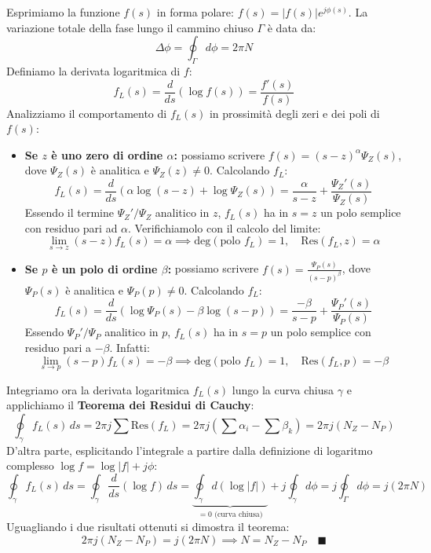 Esprimiamo la funzione $f(s)$ in forma polare: $f(s) = |f(s)| e^{j\phi(s)}$. 
La variazione totale della fase lungo il cammino chiuso $\Gamma$ è data da:
\[
    \Delta \phi = \oint_\Gamma d\phi = 2\pi N
\]
Definiamo la derivata logaritmica di $f$:
\[
    f_L(s) = \frac{d}{ds}(\log f(s)) = \frac{f'(s)}{f(s)}
\]
Analizziamo il comportamento di $f_L(s)$ in prossimità degli zeri e dei poli di $f(s)$:
\begin{itemize}
    \item \textbf{Se $z$ è uno zero di ordine $\alpha$:} possiamo scrivere $f(s) = (s-z)^\alpha \Psi_Z(s)$, dove $\Psi_Z(s)$ è analitica e $\Psi_Z(z) \neq 0$. Calcolando $f_L$:
    \[
        f_L(s) = \frac{d}{ds} \left( \alpha \log(s-z) + \log \Psi_Z(s) \right) = \frac{\alpha}{s-z} + \frac{\Psi_Z'(s)}{\Psi_Z(s)}
    \]
    Essendo il termine $\Psi_Z'/\Psi_Z$ analitico in $z$, $f_L(s)$ ha in $s=z$ un polo semplice con residuo pari ad $\alpha$. Verifichiamolo con il calcolo del limite:
    \[
        \lim_{s \to z} (s-z) f_L(s) = \alpha \implies \text{deg}(\text{polo } f_L) = 1, \quad \text{Res}(f_L, z) = \alpha
    \]
    \item \textbf{Se $p$ è un polo di ordine $\beta$:} possiamo scrivere $f(s) = \frac{\Psi_P(s)}{(s-p)^\beta}$, dove $\Psi_P(s)$ è analitica e $\Psi_P(p) \neq 0$. Calcolando $f_L$:
    \[
        f_L(s) = \frac{d}{ds} \left( \log \Psi_P(s) - \beta \log(s-p) \right) = \frac{-\beta}{s-p} + \frac{\Psi_P'(s)}{\Psi_P(s)}
    \]
    Essendo $\Psi_P'/\Psi_P$ analitico in $p$, $f_L(s)$ ha in $s=p$ un polo semplice con residuo pari a $-\beta$. Infatti:
    \[
        \lim_{s \to p} (s-p) f_L(s) = -\beta \implies \text{deg}(\text{polo } f_L) = 1, \quad \text{Res}(f_L, p) = -\beta
    \]
\end{itemize}

Integriamo ora la derivata logaritmica $f_L(s)$ lungo la curva chiusa $\gamma$ e applichiamo il \textbf{Teorema dei Residui di Cauchy}:
\[
    \oint_\gamma f_L(s) \, ds = 2\pi j \sum \text{Res}(f_L) = 2\pi j \left( \sum \alpha_i - \sum \beta_k \right) = 2\pi j (N_Z - N_P)
\]
D'altra parte, esplicitando l'integrale a partire dalla definizione di logaritmo complesso $\log f = \log |f| + j\phi$:
\[
    \oint_\gamma f_L(s) \, ds = \oint_\gamma \frac{d}{ds}(\log f) \, ds = \underbrace{ \oint_\gamma d(\log |f|) }_{=0 \text{ (curva chiusa)}} + j \oint_\gamma d\phi = j \oint_\Gamma d\phi = j (2\pi N)
\]
Uguagliando i due risultati ottenuti si dimostra il teorema:
\[
    2\pi j (N_Z - N_P) = j (2\pi N) \implies N = N_Z - N_P \quad \blacksquare
\]



